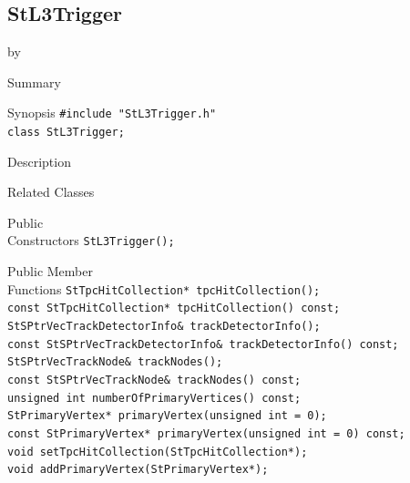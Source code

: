 \documentclass[twoside]{article}
\newcommand{\entrylabel}[1]{\mbox{\textbf{{#1}}}\hfil}%
\newenvironment{entry}
{\begin{list}{}%
    {\renewcommand{\makelabel}{\entrylabel}%
     \setlength{\labelwidth}{90pt}%
     \setlength{\leftmargin}{\labelwidth}
     \advance\leftmargin by \labelsep%
      }%
    }%
  {\end{list}}
\newcommand{\Entrylabel}[1]%
{\raisebox{0pt}[1ex][0pt]{\makebox[\labelwidth][l]%
    {\parbox[t]{\labelwidth}{\hspace{0pt}\textbf{{#1}}}}}}
\newenvironment{Entry}%
{\renewcommand{\entrylabel}{\Entrylabel}\begin{entry}}%
  {\end{entry}}
\begin{document}
\subsection{StL3Trigger}
\label{sec:StL3Trigger}
\begin{Entry}
\item[Summary]
\item[Synopsis]
    \verb+#include "StL3Trigger.h"+\\
    \verb+class StL3Trigger;+\\
\item[Description]
\item[Related Classes]
\item[Public\\ Constructors]
    \verb+StL3Trigger();+\\
\item[Public Member\\ Functions]
    \verb+StTpcHitCollection* tpcHitCollection();+\\
    \verb+const StTpcHitCollection* tpcHitCollection() const;+\\

    \verb+StSPtrVecTrackDetectorInfo& trackDetectorInfo();+\\
    \verb+const StSPtrVecTrackDetectorInfo& trackDetectorInfo() const;+\\

    \verb+StSPtrVecTrackNode& trackNodes();+\\
    \verb+const StSPtrVecTrackNode& trackNodes() const;+\\

    \verb+unsigned int numberOfPrimaryVertices() const;+\\
    \verb+StPrimaryVertex* primaryVertex(unsigned int = 0);+\\
    \verb+const StPrimaryVertex* primaryVertex(unsigned int = 0) const;+\\

    \verb+void setTpcHitCollection(StTpcHitCollection*);+\\
    \verb+void addPrimaryVertex(StPrimaryVertex*);+\\
\end{Entry}
\clearpage
\end{document}
